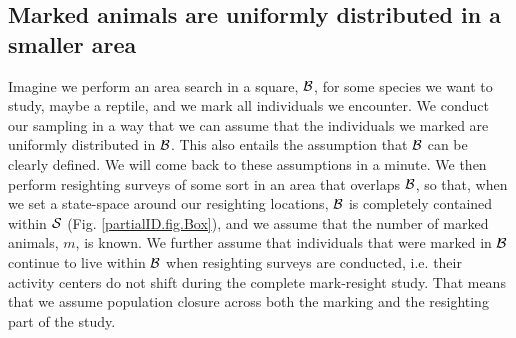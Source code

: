 \subsection{Marked animals are uniformly distributed in a smaller
  area}



Imagine we perform an area search in a square, ${\cal B}$, for some species we want to study, maybe a reptile, and we mark all individuals we encounter. We conduct our sampling in a way that we can assume that the individuals we marked are uniformly distributed in ${\cal B}$. This also entails the assumption that ${\cal B}$ can be clearly defined. We will come back to these assumptions in a minute. We then perform resighting surveys of some sort in an area that overlaps ${\cal B}$, so that, when we set a state-space around our resighting locations, ${\cal B}$ is completely contained within ${\cal S}$ (Fig. \ref{partialID.fig.Box}), and we assume that the number of marked animals, $m$, is known. We further assume that individuals that were marked in ${\cal B}$ continue to live within ${\cal B}$ when resighting surveys are conducted, i.e. their activity centers do not shift during the complete mark-resight study. That means that we assume population closure across both the marking and the resighting part of the study.

